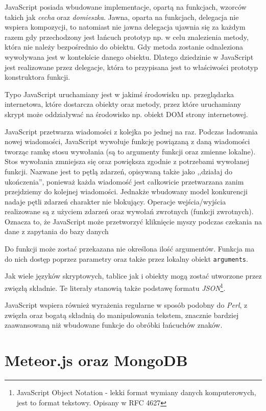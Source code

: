 JavaScript posiada wbudowane implementacje, opartą na funkcjach, wzorców takich jak \textit{cecha} oraz \textit{domieszka}. Jawna, oparta na funkcjach, delegacja nie wspiera kompozycji, to natomiast nie jawna delegacja ujawnia się za każdym razem gdy przechodzony jest łańcuch prototyp np. w celu znalezienia metody, która nie należy bezpośrednio do obiektu. Gdy metoda zostanie odnaleziona wywoływana jest w kontekście danego obiektu. Dlatego dziedzinie w JavaScript jest realizowane przez delegacje, która to przypisana jest to właściwości prototyp konstruktora funkcji\cite{jsWiki}.

Typo JavaScript uruchamiany jest w jakimś środowisku np. przeglądarka internetowa, które dostarcza obiekty oraz metody, przez które uruchamiany skrypt może oddziaływać na środowisko np. obiekt DOM strony internetowej. 

JavaScript przetwarza wiadomości z kolejka po jednej na raz. Podczas ładowania nowej wiadomości, JavaScript wywołuje funkcję powiązaną z daną wiadomości tworząc ramkę stosu wywołania (są to argumenty funkcji oraz zmienne lokalne). Stos wywołania zmniejsza się oraz powiększa zgodnie z potrzebami wywołanej funkcji. Nazwane jest to pętlą zdarzeń, opisywaną także jako ,,działaj do ukończenia'', ponieważ każda wiadomość jest całkowicie przetwarzana zanim przejdziemy do kolejnej wiadomości. Jednakże wbudowany model konkurencji nadaje pętli zdarzeń charakter nie blokujący. Operacje wejścia/wyjścia realizowane są z użyciem zdarzeń oraz wywołań zwrotnych (funkcji zwrotnych). Oznacza to, że JavaScript może przetworzyć kliknięcie myszy podczas czekania na dane z zapytania do bazy danych\cite{jsWiki}

Do funkcji może zostać przekazana nie określona ilość argumentów. Funkcja ma do nich dostęp poprzez parametry oraz także przez lokalny obiekt \verb|arguments|\cite{jsWiki}.

Jak wiele języków skryptowych, tablice jak i obiekty mogą zostać utworzone przez zwięzłą składnie. Te literały stanowią także podstawę formatu \emph{JSON}\footnote{JavaScript Object Notation - lekki format wymiany danych komputerowych, jest to format tekstowy. Opisany w RFC 4627}\cite{jsWiki}.

JavaScript wspiera również wyrażenia regularne w sposób podobny do \emph{Perl}, z zwięzła oraz bogatą składnią do manipulowania tekstem, znacznie bardziej zaawansowaną niż wbudowane funkcje do obróbki łańcuchów znaków.

\section{Meteor.js oraz MongoDB}